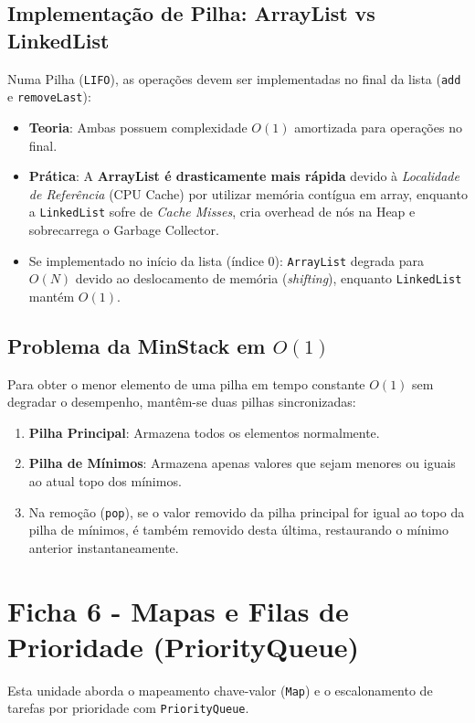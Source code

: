 \documentclass[12pt,a4paper]{article}
\begin{document}
\begin{enumerate}
\subsection*{Implementação de Pilha: ArrayList vs LinkedList}
Numa Pilha (\texttt{LIFO}), as operações devem ser implementadas no final da lista (\texttt{add} e \texttt{removeLast}):
\begin{itemize}
    \item \textbf{Teoria}: Ambas possuem complexidade $O(1)$ amortizada para operações no final.
    \item \textbf{Prática}: A \textbf{ArrayList é drasticamente mais rápida} devido à \textit{Localidade de Referência} (CPU Cache) por utilizar memória contígua em array, enquanto a \texttt{LinkedList} sofre de \textit{Cache Misses}, cria overhead de nós na Heap e sobrecarrega o Garbage Collector.
    \item Se implementado no início da lista (índice 0): \texttt{ArrayList} degrada para $O(N)$ devido ao deslocamento de memória (\textit{shifting}), enquanto \texttt{LinkedList} mantém $O(1)$.
\end{itemize}

\subsection*{Problema da MinStack em $O(1)$}
Para obter o menor elemento de uma pilha em tempo constante $O(1)$ sem degradar o desempenho, mantêm-se duas pilhas sincronizadas:
\begin{enumerate}
    \item \textbf{Pilha Principal}: Armazena todos os elementos normalmente.
    \item \textbf{Pilha de Mínimos}: Armazena apenas valores que sejam menores ou iguais ao atual topo dos mínimos.
    \item Na remoção (\texttt{pop}), se o valor removido da pilha principal for igual ao topo da pilha de mínimos, é também removido desta última, restaurando o mínimo anterior instantaneamente.
\end{enumerate}

\section{Ficha 6 - Mapas e Filas de Prioridade (PriorityQueue)}
Esta unidade aborda o mapeamento chave-valor (\texttt{Map}) e o escalonamento de tarefas por prioridade com \texttt{PriorityQueue}.


\end{enumerate}
\end{document}
